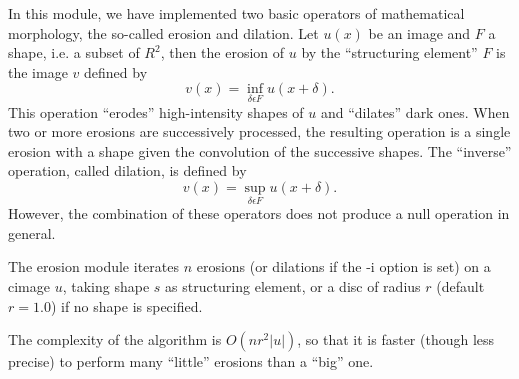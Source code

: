 In this module, we have implemented two basic operators of mathematical 
morphology, the so-called erosion and dilation. Let $u(x)$ be an image 
and $F$ a shape, i.e. a subset of $R^2$, then the erosion of $u$ by the 
``structuring element'' $F$ is the image $v$ defined by
$$v(x) = \inf_{\delta \epsilon F} u(x+\delta).$$
This operation ``erodes'' high-intensity shapes of $u$ and ``dilates'' dark 
ones. 
When two or more erosions are successively processed, the resulting operation 
is a single erosion with a shape given the convolution of the successive 
shapes.
The ``inverse'' operation, called dilation, is defined by
$$v(x) = \sup_{\delta \epsilon F} u(x+\delta).$$
However, the combination of these operators does not produce a null 
operation in general.

The {\sf erosion} module iterates $n$ erosions (or dilations if the -i option 
is set) 
on a cimage $u$, taking shape $s$ as structuring element, or a disc of radius
$r$ (default $r=1.0$) if no shape is specified.

The complexity of the algorithm is $O(n r^2 |u|)$, so that it is faster 
(though less precise) to
perform many ``little'' erosions than a ``big'' one. 

